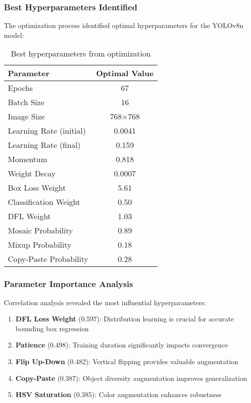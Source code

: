 \documentclass[12pt,a4paper]{article}
\begin{document}
\subsubsection{Best Hyperparameters Identified}
The optimization process identified optimal hyperparameters for the YOLOv8n model:
\begin{table}[H]
\centering
\begin{tabular}{lc}
\toprule
\textbf{Parameter} & \textbf{Optimal Value} \\
\midrule
Epochs & 67 \\
Batch Size & 16 \\
Image Size & 768×768 \\
Learning Rate (initial) & 0.0041 \\
Learning Rate (final) & 0.159 \\
Momentum & 0.818 \\
Weight Decay & 0.0007 \\
Box Loss Weight & 5.61 \\
Classification Weight & 0.50 \\
DFL Weight & 1.03 \\
Mosaic Probability & 0.89 \\
Mixup Probability & 0.18 \\
Copy-Paste Probability & 0.28 \\
\bottomrule
\end{tabular}
\caption{Best hyperparameters from optimization}
\label{tab:best_hyperparameters}
\end{table}

\subsubsection{Parameter Importance Analysis}
Correlation analysis revealed the most influential hyperparameters:
\begin{enumerate}
    \item \textbf{DFL Loss Weight} (0.597): Distribution learning is crucial for accurate bounding box regression
    \item \textbf{Patience} (0.498): Training duration significantly impacts convergence
    \item \textbf{Flip Up-Down} (0.482): Vertical flipping provides valuable augmentation
    \item \textbf{Copy-Paste} (0.387): Object diversity augmentation improves generalization
    \item \textbf{HSV Saturation} (0.385): Color augmentation enhances robustness
\end{enumerate}
\end{document}
